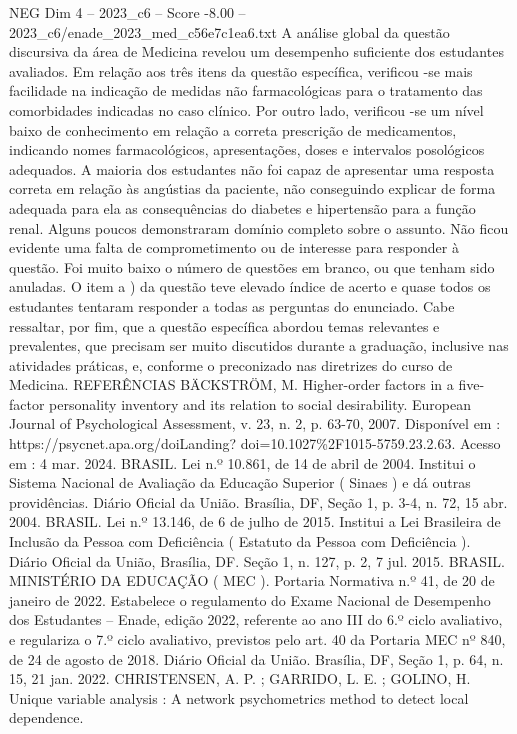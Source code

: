 \begin{textsample}{NEG Dim 4 – 2023\_c6 – Score -8.00 – 2023\_c6/enade\_2023\_med\_c56e7c1ea6.txt}
A análise global da questão discursiva da área de Medicina revelou um desempenho suficiente dos estudantes avaliados.
Em relação aos três itens da questão específica, verificou -se mais facilidade na indicação de medidas não farmacológicas para o tratamento das comorbidades indicadas no caso clínico.
Por outro lado, verificou -se um nível baixo de conhecimento em relação a correta prescrição de medicamentos, indicando nomes farmacológicos, apresentações, doses e intervalos posológicos adequados.
A maioria dos estudantes não foi capaz de apresentar uma resposta correta em relação às angústias da paciente, não conseguindo explicar de forma adequada para ela as consequências do diabetes e hipertensão para a função renal.
Alguns poucos demonstraram domínio completo sobre o assunto.
Não ficou evidente uma falta de comprometimento ou de interesse para responder à questão.
Foi muito baixo o número de questões em branco, ou que tenham sido anuladas.
O item a ) da questão teve elevado índice de acerto e quase todos os estudantes tentaram responder a todas as perguntas do enunciado.
Cabe ressaltar, por fim, que a questão específica abordou temas relevantes e prevalentes, que precisam ser muito discutidos durante a graduação, inclusive nas atividades práticas, e, conforme o preconizado nas diretrizes do curso de Medicina.
REFERÊNCIAS BÄCKSTRÖM, M.
Higher-order factors in a five-factor personality inventory and its relation to social desirability.
European Journal of Psychological Assessment, v. 23, n. 2, p. 63-70, 2007.
Disponível em : https://psycnet.apa.org/doiLanding? doi=10.1027\%2F1015-5759.23.2.63.
Acesso em : 4 mar. 2024.
BRASIL.
Lei n.º 10.861, de 14 de abril de 2004.
Institui o Sistema Nacional de Avaliação da Educação Superior ( Sinaes ) e dá outras providências.
Diário Oficial da União.
Brasília, DF, Seção 1, p. 3-4, n. 72, 15 abr. 2004.
BRASIL.
Lei n.º 13.146, de 6 de julho de 2015.
Institui a Lei Brasileira de Inclusão da Pessoa com Deficiência ( Estatuto da Pessoa com Deficiência ).
Diário Oficial da União, Brasília, DF.
Seção 1, n. 127, p. 2, 7 jul. 2015.
BRASIL.
MINISTÉRIO DA EDUCAÇÃO ( MEC ).
Portaria Normativa n.º 41, de 20 de janeiro de 2022.
Estabelece o regulamento do Exame Nacional de Desempenho dos Estudantes – Enade, edição 2022, referente ao ano III do 6.º ciclo avaliativo, e regulariza o 7.º ciclo avaliativo, previstos pelo art. 40 da Portaria MEC nº 840, de 24 de agosto de 2018.
Diário Oficial da União.
Brasília, DF, Seção 1, p. 64, n. 15, 21 jan. 2022.
CHRISTENSEN, A.
P. ; GARRIDO, L.
E. ; GOLINO, H.
Unique variable analysis : A network psychometrics method to detect local dependence.

\end{textsample}
